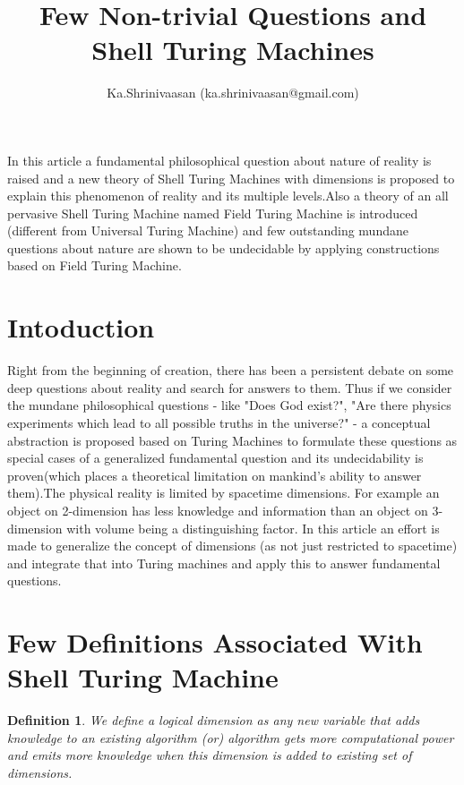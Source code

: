 \documentclass[11pt,onecolumn]{article}
\author{ Ka.Shrinivaasan (ka.shrinivaasan@gmail.com) }
\title{Few Non-trivial Questions and Shell Turing Machines}
\newtheorem{defn}{Definition}
\begin{document}
\thispagestyle{empty}
\pagestyle{empty}
\maketitle
\begin{onecolabstract}
In this article a fundamental philosophical question about nature of reality is raised and a new theory of Shell Turing Machines with dimensions is proposed to explain this phenomenon of reality and its multiple levels.Also a theory of an all pervasive Shell Turing Machine named Field Turing Machine is introduced (different from Universal Turing Machine) and few outstanding mundane questions about nature are shown to be undecidable by applying constructions based on Field Turing Machine.
\end{onecolabstract}
\section{Intoduction}
Right from the beginning of creation, there has been a persistent debate on some deep questions about reality and search for answers to them. Thus if we consider the mundane philosophical questions - like "Does God exist?", "Are there physics experiments which lead to all possible truths in the universe?" - a conceptual abstraction is proposed based on Turing Machines to formulate these questions as special cases of a generalized fundamental question and its undecidability is proven(which places a theoretical limitation on mankind's ability to answer them).The physical reality is limited by spacetime dimensions. For example an object on 2-dimension has less knowledge and information than an object on 3-dimension with volume being a distinguishing factor. In this article an effort is made to generalize the concept of dimensions (as not just restricted to spacetime) and integrate that into Turing machines and apply this to answer fundamental questions.

\section{Few Definitions Associated With Shell Turing Machine}

\begin{defn}
We define a logical dimension as any new variable that adds knowledge to an existing algorithm (or) algorithm gets more computational power and emits more knowledge when this dimension is added to existing set of dimensions. 
\end{defn}
\end{document}
